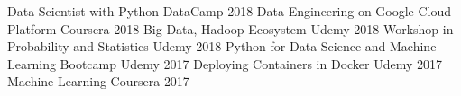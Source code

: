 

\begin{cvhonors}

  \cvhonor
    {Data Scientist with Python} %
    {DataCamp} %
    {} %
    {2018} %
  \cvhonor
    {Data Engineering on Google Cloud Platform} %
    {Coursera} %
    {} %
    {2018} %
  \cvhonor
    {Big Data, Hadoop Ecosystem} %
    {Udemy} %
    {} %
    {2018} %
  \cvhonor
    {Workshop in Probability and Statistics} %
    {Udemy} %
    {} %
    {2018} %
  \cvhonor
    {Python for Data Science and Machine Learning Bootcamp} %
    {Udemy} %
    {} %
    {2017} %
  \cvhonor
    {Deploying Containers in Docker} %
    {Udemy} %
    {} %
    {2017} %
  \cvhonor
    {Machine Learning} %
    {Coursera} %
    {} %
    {2017} %
\end{cvhonors}
